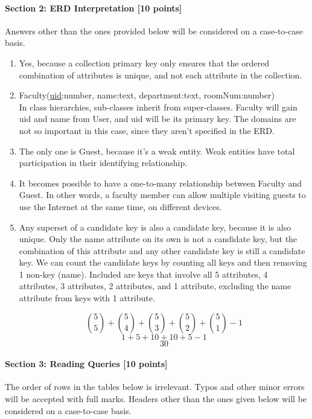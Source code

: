 \documentclass[a4paper,12pt,leqno]{article}
\begin{document}
\newpage
\paragraph{\textbf{Section 2: ERD Interpretation [10 points]}\\}
Answers other than the ones provided below will be considered on a case-to-case basis.


\begin{enumerate}
\item 
Yes, because a collection primary key only ensures that the ordered combination of attributes is unique, and not each attribute in the collection.

\item
Faculty(\underline{uid}:number, name:text, department:text, roomNum:number)\\
In class hierarchies, sub-classes inherit from super-classes. Faculty will gain uid and name from User, and uid will be its primary key. The domains are not so important in this case, since they aren't specified in the ERD.

\item
The only one is Guest, because it's a weak entity. Weak entities have total participation in their identifying relationship. 

\item
It becomes possible to have a one-to-many relationship between Faculty and Guest. In other words, a faculty member can allow multiple visiting guests to use the Internet at the same time, on different devices. 

\item Any superset of a candidate key is also a candidate key, because it is also unique. Only the name attribute on its own is not a candidate key, but the combination of this attribute and any other candidate key is still a candidate key. We can count the candidate keys by counting all keys and then removing 1 non-key (name). Included are keys that involve all 5 attributes, 4 attributes, 3 attributes, 2 attributes, and 1 attribute, excluding the name attribute from keys with 1 attribute.

$${5\choose 5} + {5\choose 4} + {5\choose 3} + {5\choose 2} + {5\choose 1} - 1$$
$$1 + 5 + 10 + 10 + 5 - 1$$
$$30$$

\end{enumerate}

\newpage
\paragraph{\textbf{Section 3: Reading Queries [10 points]}\\}
	The order of rows in the tables below is irrelevant. Typos and other minor errors will be accepted with full marks. Headers other than the ones given below will be considered on a case-to-case basis.
\end{document}
